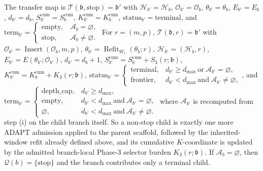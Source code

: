 \documentclass[11pt]{article}
\begin{document}
The transfer map is \(\mathcal T(\mathfrak b,\mathrm{stop})=\mathfrak b'\) with \(\mathcal H_{b'}=\mathcal H_b\), \(\mathcal O_{b'}=\mathcal O_b\), \(\theta_{b'}=\theta_b\), \(E_{b'}=E_b\), \(d_{b'}=d_b\), \(S_{b'}^{\mathrm{cum}}=S_b^{\mathrm{cum}}\), \(K_{b'}^{\mathrm{cum}}=K_b^{\mathrm{cum}}\), \(\mathrm{status}_{b'}=\mathrm{terminal}\), and \(\mathrm{term}_{b'}=\begin{cases} \mathrm{empty},&\mathcal A_b=\varnothing,\\ \mathrm{stop},&\mathcal A_b\neq\varnothing. \end{cases}\) For \(r=(m,p)\), \(\mathcal T(\mathfrak b,r)=\mathfrak b'\) with \(\mathcal O_{b'}=\operatorname{Insert}(\mathcal O_b,m,p)\), \(\theta_{b'}=\operatorname{Refit}_{W_r}(\theta_b;r)\), \(\mathcal H_{b'}=(\mathcal H_b,r)\), \(E_{b'}=E(\theta_{b'};\mathcal O_{b'})\), \(d_{b'}=d_b+1\), \(S_{b'}^{\mathrm{cum}}=S_b^{\mathrm{cum}}+S_3(r;\mathfrak b)\), \(K_{b'}^{\mathrm{cum}}=K_b^{\mathrm{cum}}+K_3(r;\mathfrak b)\), \(\mathrm{status}_{b'}=\begin{cases} \mathrm{terminal},&d_{b'}\ge d_{\max}\ \text{or}\ \mathcal A_{b'}=\varnothing,\\ \mathrm{frontier},&d_{b'}<d_{\max}\ \text{and}\ \mathcal A_{b'}\neq\varnothing, \end{cases}\), and \(\mathrm{term}_{b'}=\begin{cases} \mathrm{depth\_cap},&d_{b'}\ge d_{\max},\\ \mathrm{empty},&d_{b'}<d_{\max}\ \text{and}\ \mathcal A_{b'}=\varnothing,\\ \varnothing,&d_{b'}<d_{\max}\ \text{and}\ \mathcal A_{b'}\neq\varnothing. \end{cases}\)
where \(\mathcal A_{b'}\) is recomputed from step (i) on the child branch itself. So a non-stop child is exactly one more ADAPT admission applied to the parent scaffold, followed by the inherited-window refit already defined above, and its cumulative \(K\)-coordinate is updated by the admitted branch-local Phase-3 selector burden \(K_3(r;\mathfrak b)\). If \(\mathcal A_b=\varnothing\), then \(\mathcal Q(b)=\{\mathrm{stop}\}\) and the branch contributes only a terminal child.
\end{document}
